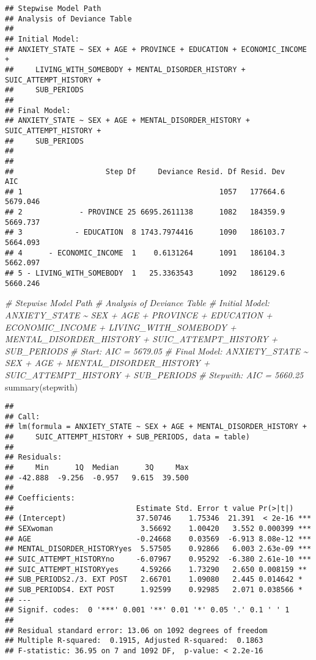 \documentclass[
]{book}
\newenvironment{Shaded}{\begin{snugshade}}{\end{snugshade}}
\newcommand{\CommentTok}[1]{\textcolor[rgb]{0.56,0.35,0.01}{\textit{#1}}}
\newcommand{\FunctionTok}[1]{\textcolor[rgb]{0.00,0.00,0.00}{#1}}
\newcommand{\NormalTok}[1]{#1}
\begin{document}
\begin{verbatim}
## Stepwise Model Path 
## Analysis of Deviance Table
## 
## Initial Model:
## ANXIETY_STATE ~ SEX + AGE + PROVINCE + EDUCATION + ECONOMIC_INCOME + 
##     LIVING_WITH_SOMEBODY + MENTAL_DISORDER_HISTORY + SUIC_ATTEMPT_HISTORY + 
##     SUB_PERIODS
## 
## Final Model:
## ANXIETY_STATE ~ SEX + AGE + MENTAL_DISORDER_HISTORY + SUIC_ATTEMPT_HISTORY + 
##     SUB_PERIODS
## 
## 
##                     Step Df     Deviance Resid. Df Resid. Dev      AIC
## 1                                             1057   177664.6 5679.046
## 2             - PROVINCE 25 6695.2611138      1082   184359.9 5669.737
## 3            - EDUCATION  8 1743.7974416      1090   186103.7 5664.093
## 4      - ECONOMIC_INCOME  1    0.6131264      1091   186104.3 5662.097
## 5 - LIVING_WITH_SOMEBODY  1   25.3363543      1092   186129.6 5660.246
\end{verbatim}

\begin{Shaded}
\begin{Highlighting}[]
\CommentTok{\# Stepwise Model Path }
\CommentTok{\# Analysis of Deviance Table}
\CommentTok{\# Initial Model: ANXIETY\_STATE \textasciitilde{} SEX + AGE + PROVINCE + EDUCATION + ECONOMIC\_INCOME + LIVING\_WITH\_SOMEBODY + MENTAL\_DISORDER\_HISTORY + SUIC\_ATTEMPT\_HISTORY + SUB\_PERIODS}
\CommentTok{\# Start:  AIC = 5679.05}
\CommentTok{\# Final Model: ANXIETY\_STATE \textasciitilde{} SEX + AGE + MENTAL\_DISORDER\_HISTORY + SUIC\_ATTEMPT\_HISTORY + SUB\_PERIODS}
\CommentTok{\# Stepwith:  AIC = 5660.25}
\FunctionTok{summary}\NormalTok{(stepwith)}
\end{Highlighting}
\end{Shaded}

\begin{verbatim}
## 
## Call:
## lm(formula = ANXIETY_STATE ~ SEX + AGE + MENTAL_DISORDER_HISTORY + 
##     SUIC_ATTEMPT_HISTORY + SUB_PERIODS, data = table)
## 
## Residuals:
##     Min      1Q  Median      3Q     Max 
## -42.888  -9.256  -0.957   9.615  39.500 
## 
## Coefficients:
##                            Estimate Std. Error t value Pr(>|t|)    
## (Intercept)                37.50746    1.75346  21.391  < 2e-16 ***
## SEXwoman                    3.56692    1.00420   3.552 0.000399 ***
## AGE                        -0.24668    0.03569  -6.913 8.08e-12 ***
## MENTAL_DISORDER_HISTORYyes  5.57505    0.92866   6.003 2.63e-09 ***
## SUIC_ATTEMPT_HISTORYno     -6.07967    0.95292  -6.380 2.61e-10 ***
## SUIC_ATTEMPT_HISTORYyes     4.59266    1.73290   2.650 0.008159 ** 
## SUB_PERIODS2./3. EXT POST   2.66701    1.09080   2.445 0.014642 *  
## SUB_PERIODS4. EXT POST      1.92599    0.92985   2.071 0.038566 *  
## ---
## Signif. codes:  0 '***' 0.001 '**' 0.01 '*' 0.05 '.' 0.1 ' ' 1
## 
## Residual standard error: 13.06 on 1092 degrees of freedom
## Multiple R-squared:  0.1915, Adjusted R-squared:  0.1863 
## F-statistic: 36.95 on 7 and 1092 DF,  p-value: < 2.2e-16
\end{verbatim}
\end{document}
